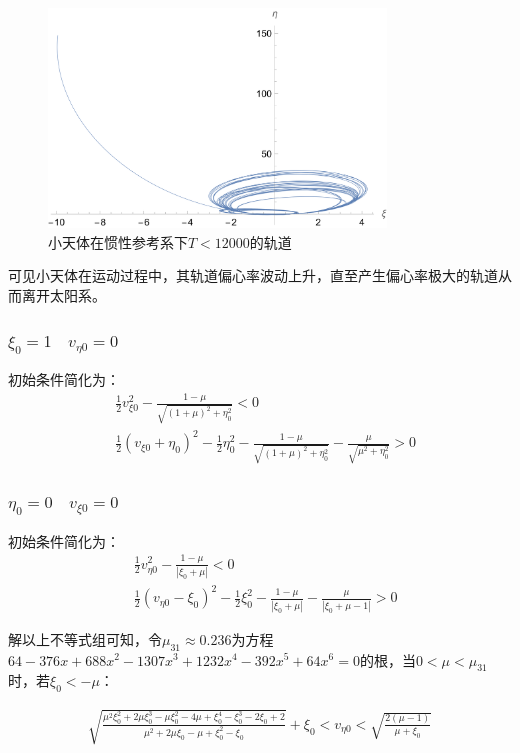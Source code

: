 \begin{figure}[h]
    \centering
    \includegraphics[width=0.8\textwidth]{figures/chapter4/特殊情况1.5.png}
    \caption{小天体在惯性参考系下$T<12000$的轨道}
\end{figure}
可见小天体在运动过程中，其轨道偏心率波动上升，直至产生偏心率极大的轨道从而离开太阳系。

\subsubsection{$\xi_0=1\quad v_{\eta0}=0$}

初始条件简化为：
\begin{align}
    &\frac{1}{2}v_{\xi0}^2-\frac{1-\mu}{\sqrt{(1+\mu)^2+\eta_0^2}}<0
    \\&\frac{1}{2}\left(v_{\xi0}+\eta_0\right)^2-\frac{1}{2}\eta_0^2-\frac{1-\mu}{\sqrt{(1+\mu)^2+\eta_0^2}}-\frac{\mu}{\sqrt{\mu^2+\eta_0^2}}>0
\end{align}

\subsubsection{$\eta_0=0\quad v_{\xi0}=0$}

初始条件简化为：
\begin{align}
    &\frac{1}{2}v_{\eta0}^2-\frac{1-\mu}{|\xi_0+\mu|}<0
    \\&\frac{1}{2}(v_{\eta0}-\xi_0)^2-\frac{1}{2}\xi_0^2-\frac{1-\mu}{|\xi_0+\mu|}-\frac{\mu}{|\xi_0+\mu-1|}>0
\end{align}

解以上不等式组可知，令$\mu_{31}\approx0.236$为方程$64-376x+688x^2-1307x^3+1232x^4-392x^5+64x^6=0$的根，当$0<\mu<\mu_{31}$时，若$\xi _0<-\mu$：

\begin{align}
    \sqrt{\frac{\mu ^2 \xi _0^2+2 \mu  \xi _0^3-\mu  \xi _0^2-4 \mu +\xi _0^4-\xi _0^3-2 \xi _0+2}{\mu ^2+2 \mu  \xi _0-\mu +\xi _0^2-\xi _0}}+\xi _0<v_{\text{$\eta $0}}<\sqrt{\frac{2(\mu -1)}{\mu +\xi _0}}
\end{align}

